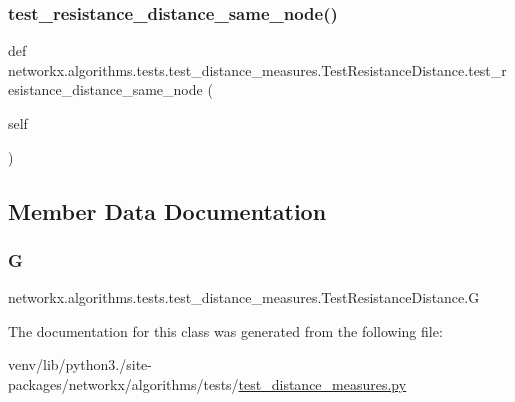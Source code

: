\subsubsection{\texorpdfstring{test\+\_\+resistance\+\_\+distance\+\_\+same\+\_\+node()}{test\_resistance\_distance\_same\_node()}}
{\footnotesize\ttfamily def networkx.\+algorithms.\+tests.\+test\+\_\+distance\+\_\+measures.\+Test\+Resistance\+Distance.\+test\+\_\+resistance\+\_\+distance\+\_\+same\+\_\+node (\begin{DoxyParamCaption}\item[{}]{self }\end{DoxyParamCaption})}



\subsection{Member Data Documentation}
\mbox{\label{classnetworkx_1_1algorithms_1_1tests_1_1test__distance__measures_1_1TestResistanceDistance_ac178e87117b316687710f593fd10457b}} 
\subsubsection{\texorpdfstring{G}{G}}
{\footnotesize\ttfamily networkx.\+algorithms.\+tests.\+test\+\_\+distance\+\_\+measures.\+Test\+Resistance\+Distance.\+G}



The documentation for this class was generated from the following file\+:\begin{DoxyCompactItemize}
\item 
venv/lib/python3./site-\/packages/networkx/algorithms/tests/\hyperlink{tests_2test__distance__measures_8py}{test\+\_\+distance\+\_\+measures.\+py}\end{DoxyCompactItemize}
